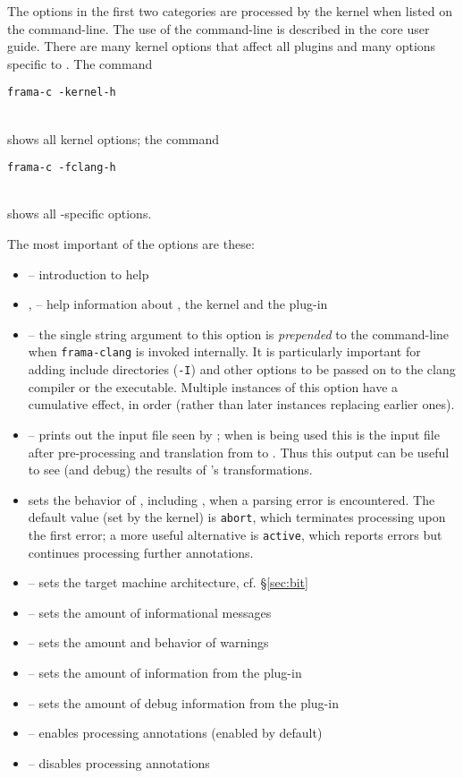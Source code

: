 The options in the first two categories are processed by the \fc kernel when listed on the \fc command-line. 
The use of the \fc command-line is described in the core \fc 
user guide.
There are many kernel options that affect all plugins and many options specific to \fclang.
The command \\
\centerline{\lstinline|frama-c -kernel-h|} \\
shows all kernel options; the command\\
\centerline{\lstinline|frama-c -fclang-h|} \\
shows all \fcl-specific options.

The most important of the options are these:
\begin{itemize}
\item {} -- introduction to \framac help
    \item {},  -- help information about \fc, the \fc kernel and the \fcl plug-in
	\item {} -- the single string argument to this option is \textit{prepended} to the command-line when 
	\lstinline|frama-clang| is invoked internally. It is particularly 
	important for adding include directories (\lstinline|-I|) and
	other options to be passed on to the clang compiler or the \irg executable. 
	Multiple instances of this option have a cumulative effect, in order (rather
	than later instances replacing earlier ones).
    \item {} -- prints out the input file seen by \fc; when \fcl is being used this is the input file after pre-processing and translation from \cpp to \C. Thus this output can be useful to see (and debug) the results of \fcl's transformations.
    \item {} sets the behavior of \framac, including \fclang, when a parsing error is encountered. The default value (set by the kernel) is \texttt{abort}, which terminates processing upon the first error; a more useful alternative is \texttt{active}, which reports errors but continues processing further annotations.
	\item {} -- sets the target machine architecture, cf. \S\ref{sec:bit}
	\item {} -- sets the amount of informational messages
	\item {} -- sets the amount and behavior of warnings
	\item {} -- sets the amount of information from the \fclang plug-in
	\item {} -- sets the amount of debug information from the \fclang plug-in
	\item {} -- enables processing \acslpp annotations (enabled by default)
	\item {} -- disables processing \acslpp annotations
\end{itemize}

